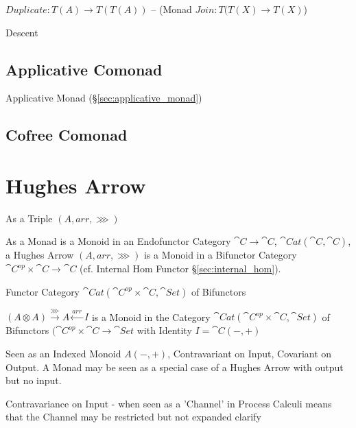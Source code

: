 $Duplicate : T(A) \rightarrow T(T(A))$ -- (Monad $Join : T(T(X)
\rightarrow T(X)$)


Descent



\subsection{Applicative Comonad}\label{sec:applicative_comonad}

Applicative Monad (\S\ref{sec:applicative_monad})



\subsection{Cofree Comonad}\label{sec:cofree_comonad}



\section{Hughes Arrow}\label{sec:hughes_arrow}

As a Triple $(A, arr, \ggg)$

As a Monad is a Monoid in an Endofunctor Category $\cat{C} \rightarrow
\cat{C}$, $\cat{Cat}(\cat{C},\cat{C})$, a Hughes Arrow $(A, arr,
\ggg)$ is a Monoid in a Bifunctor Category $\cat{C}^{op} \times
\cat{C} \rightarrow \cat{C}$ (cf. Internal Hom Functor
\S\ref{sec:internal_hom}).

Functor Category $\cat{Cat}(\cat{C}^{op} \times \cat{C},
\cat{Set})$ of Bifunctors

$(A \otimes A) \xrightarrow{\ggg} A \xleftarrow{arr} I$ is a Monoid in
the Category $\cat{Cat} (\cat{C}^{op} \times \cat{C}, \cat{Set})$ of
Bifunctors $(\cat{C}^{op} \times \cat{C} \rightarrow \cat{Set}$ with
Identity $I = \cat{C} (-,+)$

Seen as an Indexed Monoid $A(-,+)$, Contravariant on Input, Covariant
on Output. A Monad may be seen as a special case of a Hughes Arrow
with output but no input.

Contravariance on Input - when seen as a 'Channel' in Process Calculi
means that the Channel may be restricted but not expanded %
clarify

